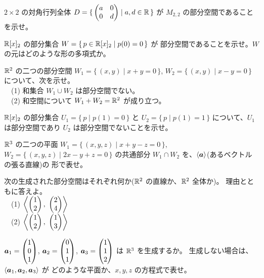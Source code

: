 \begin{mondai}[基本]\label{q:sub-ex3}
$2 \times 2$ の対角行列全体
$D = \{\, \begin{pmatrix}a & 0 \\ 0 & d\end{pmatrix} \mid a, d \in \mathbb{R} \,\}$
が $M_{2,2}$ の部分空間であることを示せ。
\end{mondai}

\begin{mondai}[基本]\label{q:sub-ex4}
$\mathbb{R}[x]_2$ の部分集合 $W = \{\, p \in \mathbb{R}[x]_2 \mid p(0) = 0 \,\}$ が
部分空間であることを示せ。$W$ の元はどのような形の多項式か。
\end{mondai}

\begin{mondai}[標準]\label{q:sub-ex5}
$\mathbb{R}^2$ の二つの部分空間
$W_1 = \{\, (x, y) \mid x + y = 0 \,\}$,
$W_2 = \{\, (x, y) \mid x - y = 0 \,\}$ について、次を示せ。\\
　(1) 和集合 $W_1 \cup W_2$ は部分空間でない。\\
　(2) 和空間について $W_1 + W_2 = \mathbb{R}^2$ が成り立つ。
\end{mondai}

\begin{mondai}[標準]\label{q:sub-ex6}
$\mathbb{R}[x]_2$ の部分集合
$U_1 = \{\, p \mid p(1) = 0 \,\}$ と $U_2 = \{\, p \mid p(1) = 1 \,\}$
について、$U_1$ は部分空間であり $U_2$ は部分空間でないことを示せ。
\end{mondai}

\begin{mondai}[標準]\label{q:sub-ex7}
$\mathbb{R}^3$ の二つの平面
$W_1 = \{\, (x, y, z) \mid x + y - z = 0 \,\}$,
$W_2 = \{\, (x, y, z) \mid 2x - y + z = 0 \,\}$ の共通部分
$W_1 \cap W_2$ を、$\langle \bm{a} \rangle$(あるベクトルの張る直線)の
形で表せ。
\end{mondai}

\begin{mondai}[標準]\label{q:sub-ex8}
次の生成された部分空間はそれぞれ何か($\mathbb{R}^2$ の直線か、$\mathbb{R}^2$ 全体か)。
理由とともに答えよ。\\
　(1) $\left\langle \begin{pmatrix}1 \\ 2\end{pmatrix},\ \begin{pmatrix}2 \\ 4\end{pmatrix} \right\rangle$\\
　(2) $\left\langle \begin{pmatrix}1 \\ 2\end{pmatrix},\ \begin{pmatrix}1 \\ 3\end{pmatrix} \right\rangle$
\end{mondai}

\begin{mondai}[発展]\label{q:sub-ex9}
$\bm{a}_1 = \begin{pmatrix}1 \\ 0 \\ 1\end{pmatrix}$, $\bm{a}_2 = \begin{pmatrix}0 \\ 1 \\ 1\end{pmatrix}$,
$\bm{a}_3 = \begin{pmatrix}1 \\ 1 \\ 2\end{pmatrix}$ は $\mathbb{R}^3$ を生成するか。
生成しない場合は、$\langle \bm{a}_1, \bm{a}_2, \bm{a}_3 \rangle$ が
どのような平面か、$x, y, z$ の方程式で表せ。
\end{mondai}


